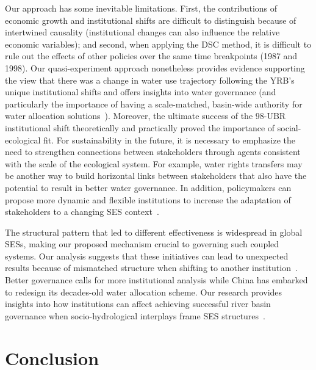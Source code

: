 \documentclass[preprint, 12pt]{elsarticle}
\begin{document}
Our approach has some inevitable limitations.
First, the contributions of economic growth and institutional shifts are difficult to distinguish because of intertwined causality (institutional changes can also influence the relative economic variables);
and second, when applying the DSC method, it is difficult to rule out the effects of other policies over the same time breakpoints (1987 and 1998).
Our quasi-experiment approach nonetheless provides evidence supporting the view that there was a change in water use trajectory following the YRB's unique institutional shifts and offers insights into water governance (and particularly the importance of having a scale-matched, basin-wide authority for water allocation solutions~\cite{bodin2017b, ostrom2009, reyers2018}).
Moreover, the ultimate success of the 98-UBR institutional shift theoretically and practically proved the importance of social-ecological fit.
For sustainability in the future, it is necessary to emphasize the need to strengthen connections between stakeholders through agents consistent with the scale of the ecological system.
For example, water rights transfers may be another way to build horizontal links between stakeholders that also have the potential to result in better water governance.
In addition, policymakers can propose more dynamic and flexible institutions to increase the adaptation of stakeholders to a changing SES context~\cite{reyers2018}.

The structural pattern that led to different effectiveness is widespread in global SESs, making our proposed mechanism crucial to governing such coupled systems.
Our analysis suggests that these initiatives can lead to unexpected results because of mismatched structure when shifting to another institution~\cite{bodin2017b}.
Better governance calls for more institutional analysis while China has embarked to redesign its decades-old water allocation scheme.
Our research provides insights into how institutions can affect achieving successful river basin governance when socio-hydrological interplays frame SES structures~\cite{muneepeerakul2017, leslie2015, hegwood2022}.


\section{Conclusion}\label{sec:conclusion}
\end{document}
